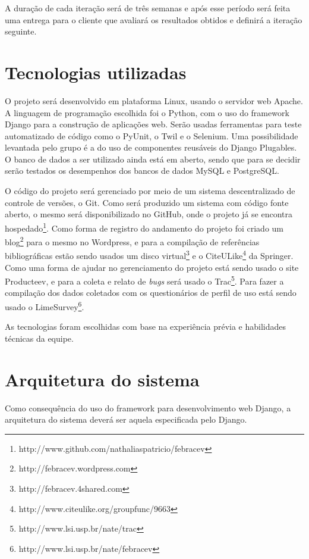 \documentclass[a4paper,12pt,font=plain,header=plain]{abnt}
\begin{document}
	A duração de cada iteração será de três semanas e após esse período será feita uma entrega para o cliente que avaliará os resultados obtidos e definirá a iteração seguinte.


	\chapter{Tecnologias utilizadas}
	
	O projeto será desenvolvido em plataforma Linux, usando o servidor web Apache. A linguagem de programação escolhida foi o Python, com o uso do framework Django para a construção de aplicações web. Serão usadas ferramentas para teste automatizado de código como o PyUnit, o Twil e o Selenium. Uma possibilidade levantada pelo grupo é a do uso de componentes reusáveis do Django Plugables. O banco de dados a ser utilizado ainda está em aberto, sendo que para se decidir serão testados os desempenhos dos bancos de dados MySQL e PostgreSQL.
	
	O código do projeto será gerenciado por meio de um sistema descentralizado de controle de versões, o Git. Como será produzido um sistema com código fonte aberto, o mesmo será disponibilizado no GitHub, onde o projeto já se encontra hospedado\footnote{http://www.github.com/nathaliaspatricio/febracev}. Como forma de registro do andamento do projeto foi criado um blog\footnote{http://febracev.wordpress.com} para o mesmo no Wordpress, e para a compilação de referências bibliográficas estão sendo usados um disco virtual\footnote{http://febracev.4shared.com} e o CiteULike\footnote{http://www.citeulike.org/groupfunc/9663} da Springer. Como uma forma de ajudar no gerenciamento do projeto está sendo usado o site Producteev, e para a coleta e relato de \textit{bugs} será usado o Trac\footnote{http://www.lsi.usp.br/nate/trac}. Para fazer a compilação dos dados coletados com os questionários de perfil de uso está sendo usado o LimeSurvey\footnote{http://www.lsi.usp.br/nate/febracev}.
	
	As tecnologias foram escolhidas com base na experiência prévia e habilidades técnicas da equipe.

  	\chapter{Arquitetura do sistema}

	Como consequência do uso do framework para desenvolvimento web Django, a arquitetura do sistema deverá ser aquela especificada pelo Django. 
	
\end{document}
